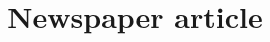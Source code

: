 \documentclass[12pt]{article}
\title{Newspaper article}
\makeatletter
\newcommand\iraggedright{%
	\let\\\@centercr\@rightskip\@flushglue \rightskip\@rightskip
	\leftskip\z@skip}
\makeatother
\begin{document}
	\makeheader
	\iraggedright
\end{document}
